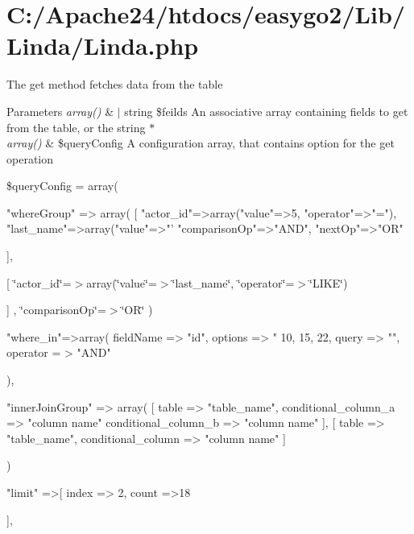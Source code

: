 \hypertarget{_c_1_2_apache24_2htdocs_2easygo2_2_lib_2_linda_2_linda_8php-example}{}\section{C\+:/\+Apache24/htdocs/easygo2/\+Lib/\+Linda/\+Linda.\+php}
The get method fetches data from the table 
\begin{DoxyParams}{Parameters}
{\em array()} & $\vert$ string \$feilds An associative array containing fields to get from the table, or the string $\ast$ \\
\hline
{\em array()} & \$query\+Config A configuration array, that contains option for the get operation\\
\hline
\end{DoxyParams}
\$query\+Config = array( \begin{DoxyVerb}               "whereGroup" => array(  
                 [
                     "actor_id"=>array("value"=>5, "operator"=>"="),
                    "last_name"=>array("value"=>"'%
                    "comparisonOp"=>"AND",
                    "nextOp"=>"OR"
\end{DoxyVerb}
 \mbox{]},

\mbox{[} \char`\"{}actor\+\_\+id\char`\"{}=$>$array(\char`\"{}value\char`\"{}=$>$\char`\"{}last\+\_\+name\char`\"{}, \char`\"{}operator\char`\"{}=$>$\char`\"{}\+L\+I\+K\+E\char`\"{})

\mbox{]} , \char`\"{}comparison\+Op\char`\"{}=$>$\char`\"{}\+O\+R\char`\"{} )

\begin{DoxyVerb}                  "where_in"=>array(
                         fieldName => "id",
                         options => " 10, 15, 22,
                           query => "",
                          operator = > "AND"

                      ),

                 "innerJoinGroup" => array(
                   [
                   table => "table_name",
                   conditional_column_a => "column name" 
                   conditional_column_b => "column name" 
                   ],
                   [
                 table => "table_name",
                   conditional_column => "column name" 
                   ]


                 ) 

                  "limit" =>[
                           index => 2,
                           count =>18

                         ],\end{DoxyVerb}



